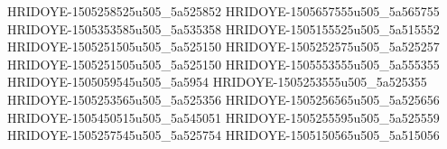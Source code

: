 HRIDOYE-1505258525u505_5a525852
HRIDOYE-1505657555u505_5a565755
HRIDOYE-1505353585u505_5a535358
HRIDOYE-1505155525u505_5a515552
HRIDOYE-1505251505u505_5a525150
HRIDOYE-1505252575u505_5a525257
HRIDOYE-1505251505u505_5a525150
HRIDOYE-1505553555u505_5a555355
HRIDOYE-1505059545u505_5a5954
HRIDOYE-1505253555u505_5a525355
HRIDOYE-1505253565u505_5a525356
HRIDOYE-1505256565u505_5a525656
HRIDOYE-1505450515u505_5a545051
HRIDOYE-1505255595u505_5a525559
HRIDOYE-1505257545u505_5a525754
HRIDOYE-1505150565u505_5a515056
